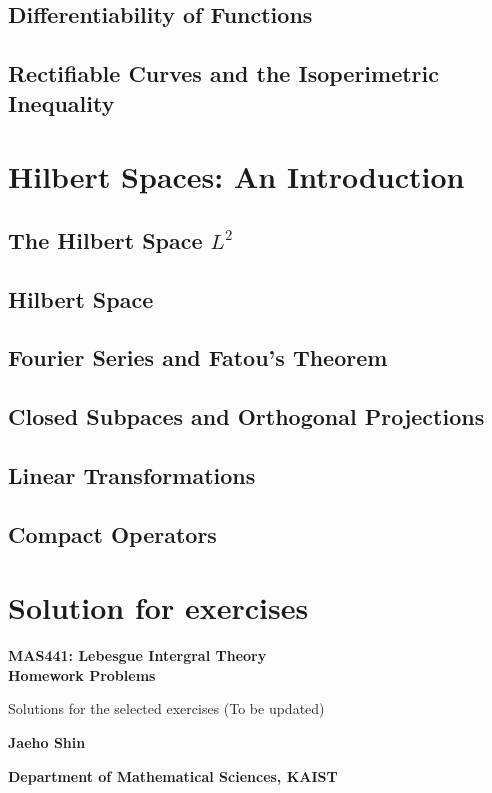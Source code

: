 \documentclass[12pt, a4paper, openany, twoside]{book}
\theoremstyle{definition}
\theoremstyle{remark}
\theoremstyle{plain}
\numberwithin{equation}{section}
\begin{document}
\section{Differentiability of Functions}
\section{Rectifiable Curves and the Isoperimetric Inequality}

\newpage
\chapter{Hilbert Spaces: An Introduction}
\section{The Hilbert Space $L^2$}
\section{Hilbert Space}
\section{Fourier Series and Fatou's Theorem}
\section{Closed Subpaces and Orthogonal Projections}
\section{Linear Transformations}
\section{Compact Operators}

\newpage
\chapter{Solution for exercises}
\begin{center}
    \vspace*{4cm}
        
    \Huge
    \textbf{MAS441: Lebesgue Intergral Theory\\\vspace{2mm}
    Homework Problems}

    \vspace{1cm}
    \large
    Solutions for the selected exercises (To be updated)
    \vspace{3cm}
    
    \LARGE
    \textbf{Jaeho Shin}
        
    \vspace{5cm}
        
    \normalsize
    \textbf{Department of Mathematical Sciences, KAIST}\\  
\end{center}
\end{document}
